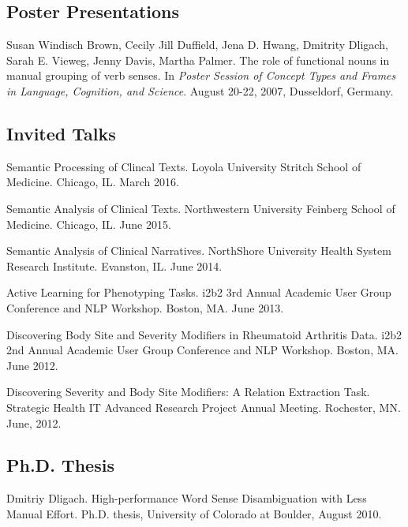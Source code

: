 \documentclass[letterpaper]{article}
\renewenvironment{itemize}{
  \begin{list}{}{
    \setlength{\leftmargin}{1.5em}
  }
}{
  \end{list}
}
\begin{document}
\subsection*{Poster Presentations}

\begin{itemize}
\item Susan Windisch Brown, Cecily Jill Duffield, Jena D. Hwang, Dmitrity Dligach, Sarah E. Vieweg, Jenny Davis, Martha Palmer. The role of functional nouns in manual grouping of verb senses. In \emph {Poster Session of Concept Types and Frames in Language, Cognition, and Science}. August 20-22, 2007, Dusseldorf, Germany.
\end{itemize}

\subsection*{Invited Talks}
\begin{itemize}
\item Semantic Processing of Clincal Texts. Loyola University Stritch School of Medicine. Chicago, IL. March 2016.
\item Semantic Analysis of Clinical Texts. Northwestern University Feinberg School of Medicine. Chicago, IL. June 2015.
\item Semantic Analysis of Clinical Narratives. NorthShore University Health System Research Institute. Evanston, IL. June 2014.
\item Active Learning for Phenotyping Tasks. i2b2 3rd Annual Academic User Group Conference and NLP Workshop. Boston, MA. June 2013.
\item Discovering Body Site and Severity Modifiers in Rheumatoid Arthritis Data. i2b2 2nd Annual Academic User Group Conference and NLP Workshop. Boston, MA. June 2012.
\item Discovering Severity and Body Site Modifiers: A Relation Extraction Task. Strategic Health IT Advanced Research Project Annual Meeting. Rochester, MN. June, 2012.
\end{itemize}

\subsection*{Ph.D. Thesis}
\begin{itemize}
\item Dmitriy Dligach. High-performance Word Sense Disambiguation with Less Manual Effort. Ph.D. thesis, University of Colorado at Boulder, August 2010.
\end{itemize}
\end{document}
